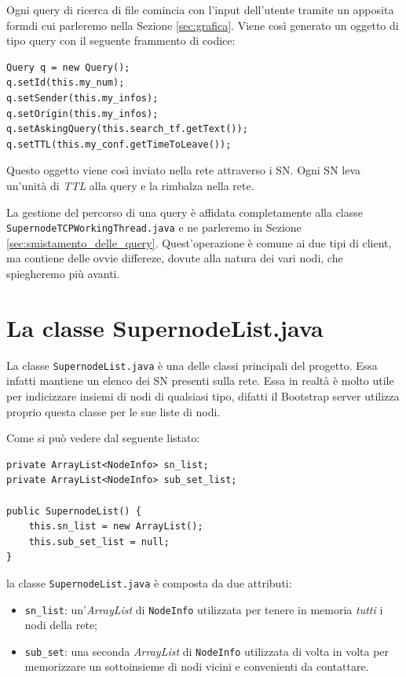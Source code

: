 Ogni query di ricerca di file comincia con l'input dell'utente tramite un apposita formdi cui parleremo nella Sezione \ref{sec:grafica}.
Viene così generato un oggetto di tipo query con il seguente frammento di codice:
\begin{lstlisting}
Query q = new Query();
q.setId(this.my_num);
q.setSender(this.my_infos);
q.setOrigin(this.my_infos);
q.setAskingQuery(this.search_tf.getText());
q.setTTL(this.my_conf.getTimeToLeave());
\end{lstlisting}
Questo oggetto viene così inviato nella rete attraverso i SN.
Ogni SN leva un'unità di \emph{TTL} alla query e la rimbalza nella rete.

La gestione del percorso di una query è affidata completamente alla classe \verb|SupernodeTCPWorkingThread.java| e ne parleremo in Sezione \ref{sec:smistamento_delle_query}.
Quest'operazione è comune ai due tipi di client, ma contiene delle ovvie differeze, dovute alla natura dei vari nodi, che spiegheremo più avanti.

\section{La classe SupernodeList.java}
La classe \verb|SupernodeList.java| è una delle classi principali del progetto. Essa infatti mantiene un elenco dei SN presenti sulla rete.
Essa in realtà è molto utile per indicizzare insiemi di nodi di qualsiasi tipo, difatti il Bootstrap server utilizza proprio questa classe per le sue liste di nodi.

Come si può vedere dal seguente listato:
\begin{lstlisting}
private ArrayList<NodeInfo> sn_list;
private ArrayList<NodeInfo> sub_set_list;

public SupernodeList() {
	this.sn_list = new ArrayList();
	this.sub_set_list = null;
}
\end{lstlisting}

la classe \verb|SupernodeList.java| è composta da due attributi:
\begin{itemize}
 \item \verb|sn_list|:
un'\emph{ArrayList} di \verb|NodeInfo| utilizzata per tenere in memoria \emph{tutti} i nodi della rete;

 \item \verb|sub_set|:
una seconda \emph{ArrayList} di \verb|NodeInfo| utilizzata di volta in volta per memorizzare un sottoinsieme di nodi vicini e convenienti da contattare.
\end{itemize}

